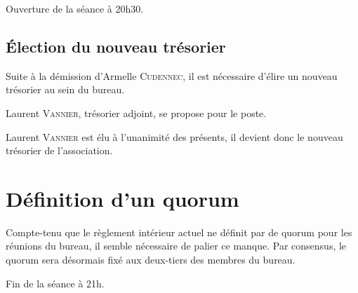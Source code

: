 \documentclass[a4paper, 11pt]{article}
\begin{document}
	\bigskip

	Ouverture de la séance à 20h30.

	\bigskip

	\subsection{Élection du nouveau trésorier}

	Suite à la démission d'Armelle \textsc{Cudennec}, il est nécessaire d'élire un nouveau trésorier au sein du
	bureau.

	Laurent \textsc{Vannier}, trésorier adjoint, se propose pour le poste.

	Laurent \textsc{Vannier} est élu à l'unanimité des présents, il devient donc le nouveau trésorier de
	l'association.

	\section{Définition d'un quorum}
	
	Compte-tenu que le règlement intérieur actuel ne définit par de quorum pour les réunions du bureau, il semble
	nécessaire de palier ce manque. Par consensus, le quorum sera désormais fixé aux deux-tiers des membres du
	bureau.

	\bigskip

	Fin de la séance à 21h.

	\bigskip
\end{document}

